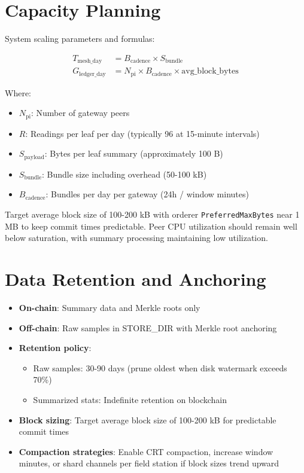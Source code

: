 \documentclass[12pt]{article}
\begin{document}
\section{Capacity Planning}
\label{sec:capacity}

System scaling parameters and formulas:

\begin{align}
T_{\text{mesh\_day}} &= B_{\text{cadence}} \times S_{\text{bundle}} \\
G_{\text{ledger\_day}} &= N_{\text{pi}} \times B_{\text{cadence}} \times \text{avg\_block\_bytes}
\end{align}

Where:
\begin{itemize}
    \item $N_{\text{pi}}$: Number of gateway peers
    \item $R$: Readings per leaf per day (typically 96 at 15-minute intervals)
    \item $S_{\text{payload}}$: Bytes per leaf summary (approximately 100 B)
    \item $S_{\text{bundle}}$: Bundle size including overhead (50-100 kB)
    \item $B_{\text{cadence}}$: Bundles per day per gateway (24h / window minutes)
\end{itemize}

Target average block size of 100-200 kB with orderer \texttt{PreferredMaxBytes} near 1 MB to keep commit times predictable. Peer CPU utilization should remain well below saturation, with summary processing maintaining low utilization.

\section{Data Retention and Anchoring}
\label{sec:retention}

\begin{itemize}
    \item \textbf{On-chain}: Summary data and Merkle roots only
    \item \textbf{Off-chain}: Raw samples in \gls{STORE_DIR} with Merkle root anchoring
    \item \textbf{Retention policy}:
    \begin{itemize}
        \item Raw samples: 30-90 days (prune oldest when disk watermark exceeds 70\%)
        \item Summarized stats: Indefinite retention on blockchain
    \end{itemize}
    \item \textbf{Block sizing}: Target average block size of 100-200 kB for predictable commit times
    \item \textbf{Compaction strategies}: Enable CRT compaction, increase window minutes, or shard channels per field station if block sizes trend upward
\end{itemize}
\end{document}
